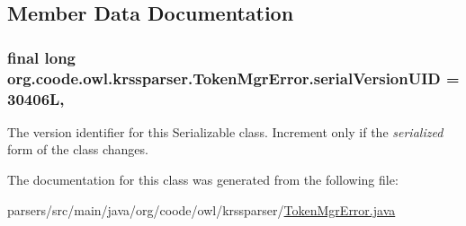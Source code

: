 \subsection{Member Data Documentation}
\hypertarget{classorg_1_1coode_1_1owl_1_1krssparser_1_1_token_mgr_error_a3cd05cbe5677d74bb8d942f9904af78e}{
\subsubsection[{serial\-Version\-U\-I\-D}]{\setlength{\rightskip}{0pt plus 5cm}final long org.\-coode.\-owl.\-krssparser.\-Token\-Mgr\-Error.\-serial\-Version\-U\-I\-D = 30406\-L\hspace{0.3cm}{\ttfamily [static]}, {\ttfamily [private]}}}\label{classorg_1_1coode_1_1owl_1_1krssparser_1_1_token_mgr_error_a3cd05cbe5677d74bb8d942f9904af78e}
The version identifier for this Serializable class. Increment only if the {\itshape serialized} form of the class changes. 

The documentation for this class was generated from the following file\-:\begin{DoxyCompactItemize}
\item 
parsers/src/main/java/org/coode/owl/krssparser/\hyperlink{org_2coode_2owl_2krssparser_2_token_mgr_error_8java}{Token\-Mgr\-Error.\-java}\end{DoxyCompactItemize}
